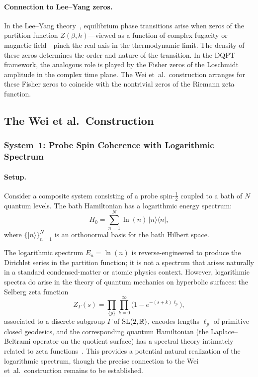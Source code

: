 \paragraph{Connection to Lee--Yang zeros.}
In the Lee--Yang theory~\cite{leeyang1952,fisher1965}, equilibrium phase transitions
arise when zeros of the partition function $Z(\beta,h)$---viewed as a function of
complex fugacity or magnetic field---pinch the real axis in the thermodynamic limit.
The density of these zeros determines the order and nature of the transition. In the
DQPT framework, the analogous role is played by the Fisher zeros of the Loschmidt
amplitude in the complex time plane. The Wei et~al.\ construction arranges for these
Fisher zeros to coincide with the nontrivial zeros of the Riemann zeta function.


\subsection{The Wei et al.\ Construction}
\label{sec:wei}

\subsubsection{System~1: Probe Spin Coherence with Logarithmic Spectrum}
\label{sec:system1}

\paragraph{Setup.}
Consider a composite system consisting of a probe spin-$\tfrac{1}{2}$ coupled to a
bath of $N$ quantum levels. The bath Hamiltonian has a logarithmic energy spectrum:
\begin{equation}\label{eq:H0}
  H_0 = \sum_{n=1}^{N} \ln(n)\,|n\rangle\langle n|,
\end{equation}
where $\{|n\rangle\}_{n=1}^{N}$ is an orthonormal basis for the bath Hilbert space.

\begin{remark}\label{rem:spectrum}
The logarithmic spectrum $E_n = \ln(n)$ is reverse-engineered to produce the Dirichlet
series in the partition function; it is not a spectrum that arises naturally in a
standard condensed-matter or atomic physics context. However, logarithmic spectra do
arise in the theory of quantum mechanics on hyperbolic surfaces: the Selberg zeta
function
\begin{equation}\label{eq:selberg}
  Z_\Gamma(s) = \prod_{\{p\}} \prod_{k=0}^{\infty}
  \bigl(1 - e^{-(s+k)\ell_p}\bigr),
\end{equation}
associated to a discrete subgroup $\Gamma$ of $\mathrm{SL}(2,\mathbb{R})$, encodes lengths
$\ell_p$ of primitive closed geodesics, and the corresponding quantum Hamiltonian (the
Laplace--Beltrami operator on the quotient surface) has a spectral theory intimately
related to zeta functions~\cite{edwards1974}. This provides a potential natural
realization of the logarithmic spectrum, though the precise connection to the
Wei et~al.\ construction remains to be established.
\end{remark}

